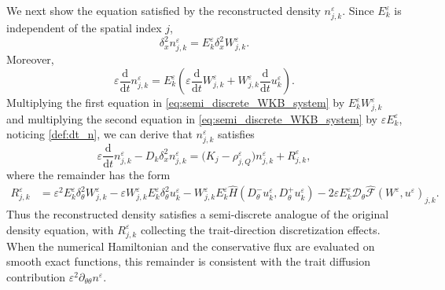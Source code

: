 \documentclass[11pt]{article}
\begin{document}
We next show the equation satisfied by the reconstructed density
\(n_{j,k}^\varepsilon\). Since \(E_k^\varepsilon\) is independent of the
spatial index \(j\),
\[
\delta_x^2 n_{j,k}^\varepsilon
=
E_k^\varepsilon\delta_x^2W_{j,k}^\varepsilon .
\]
Moreover,
\begin{equation}\label{def:dt_n}
\varepsilon\frac{\mathrm d}{\mathrm dt}n_{j,k}^\varepsilon
=
E_k^\varepsilon
\left(
\varepsilon\frac{\mathrm d}{\mathrm dt}W_{j,k}^\varepsilon
+
W_{j,k}^\varepsilon
\frac{\mathrm d}{\mathrm dt}u_k^\varepsilon
\right).
\end{equation}
Multiplying the first equation in \eqref{eq:semi_discrete_WKB_system} by $E_k^\varepsilon W_{j,k}^\varepsilon$ and multiplying the second equation in  \eqref{eq:semi_discrete_WKB_system} by $\varepsilon E_k^\varepsilon$, 
noticing \eqref{def:dt_n},
we can derive that \(n_{j,k}^\varepsilon\) satisfies
\begin{equation}\label{eq:semi_discrete_n}
\varepsilon\frac{\mathrm d}{\mathrm dt} n_{j,k}^\varepsilon
-
D_k\delta_x^2 n_{j,k}^\varepsilon
=
\bigl(K_j-\rho_{j,Q}^\varepsilon\bigr)n_{j,k}^\varepsilon
+
R_{j,k}^\varepsilon ,
\end{equation}
where the remainder has the form 
\begin{align}
R_{j,k}^\varepsilon
&=
\varepsilon^2
E_k^\varepsilon
\delta_\theta^2 W_{j,k}^\varepsilon
-
\varepsilon
W_{j,k}^\varepsilon
E_k^\varepsilon
\delta_\theta^2 u_k^\varepsilon
-
W_{j,k}^\varepsilon
E_k^\varepsilon
\widehat H
\left(
D_\theta^-u_k^\varepsilon,
D_\theta^+u_k^\varepsilon
\right)
-
2\varepsilon
E_k^\varepsilon
\mathcal D_\theta
\widehat{\mathcal F}(W^\varepsilon,u^\varepsilon)_{j,k}.
\label{eq:R_exact}
\end{align}
Thus the reconstructed density satisfies a semi-discrete analogue of the
original density equation, with \(R_{j,k}^\varepsilon\) collecting the
trait-direction discretization effects. When the numerical Hamiltonian and
the conservative flux are evaluated on smooth exact functions, this remainder
is consistent with the trait diffusion contribution
\(\varepsilon^2\partial_{\theta\theta}n^\varepsilon\).
\end{document}
